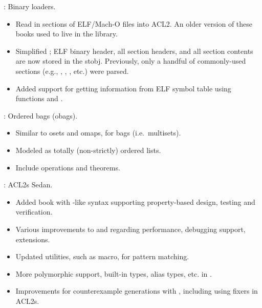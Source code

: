 
\begin{frame}

\newlibtitle

:
Binary loaders.
\begin{itemize}
\item Read in sections of ELF/Mach-O files into ACL2. An older version
      of these books used to live in the  library.
\item Simplified ; ELF binary header, all section
      headers, and all section contents are now stored in the 
      stobj. Previously, only a handful of commonly-used sections (e.g.,
      , , , etc.) were parsed.
\item Added support for getting information from ELF symbol table
      using functions  and
      .
\end{itemize}
\end{frame}


\begin{frame}

\newlibtitle

:
Ordered bags (obags).
\begin{itemize}
\item Similar to osets and omaps, for bags (i.e.\ multisets).
\item Modeled as totally (non-strictly) ordered lists.
\item Include operations and theorems.
\end{itemize}

\end{frame}


\begin{frame}

\implibtitle

: ACL2s Sedan.
\begin{itemize}
\item Added  book with -like syntax
  supporting property-based design, testing and verification.
\item Various improvements to  and 
  regarding performance, debugging support, extensions.
\item Updated utilities, such as  macro, for pattern matching.
\item More polymorphic support, built-in types, alias types, etc.
  in .
\item Improvements for counterexample generations with ,
  including using fixers in ACL2s.
\end{itemize}

\end{frame}

